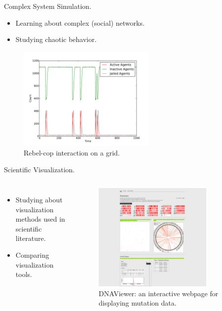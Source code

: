 \documentclass[red]{beamer}
\begin{document}
\begin{frame}{Complex System Simulation.}
  \begin{itemize}
  \item 
    Learning about complex (social) networks.
  \item
    Studying chaotic behavior.
  \end{itemize}
  \begin{figure}[H]
    \centering
    \includegraphics[width = 0.6\textwidth]{original_7.pdf}
    \caption{Rebel-cop interaction on a grid.}
  \end{figure}
\end{frame}

\begin{frame}{Scientific Visualization.}
  \begin{columns}[c]
    \begin{itemize}
    \item 
      Studying about visualization methods used in scientific literature.
    \item
      Comparing visualization tools.
    \end{itemize}
    \begin{figure}[H]
      \centering
      \includegraphics[width = 0.8\textwidth]{summarypage.png}
      \caption{DNAViewer: an interactive webpage for displaying mutation data.}
    \end{figure}
  \end{columns}
\end{frame}
\end{document}
